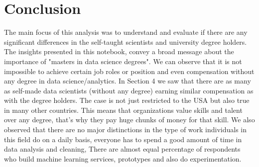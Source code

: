 \chapter{Conclusion}
The main focus of this analysis was to understand and evaluate if there are any significant differences in the self-taught scientists and university degree holders. The insights presented in this notebook, convey a broad message about the importance of "masters in data science degrees". We can observe that it is not impossible to achieve certain job roles or position and even compensation without any degree in data science/analytics. In Section 4 we saw that there are as many as self-made data scientists (without any degree) earning similar compensation as with the degree holders. The case is not just restricted to the USA but also true in many other countries. This means that organizations value skills and talent over any degree, that's why they pay huge chunks of money for that skill. We also observed that there are no major distinctions in the type of work individuals in this field do on a daily basis, everyone has to spend a good amount of time in data analysis and cleaning, There are almost equal percentage of respondents who build machine learning services, prototypes and also do experimentation.

